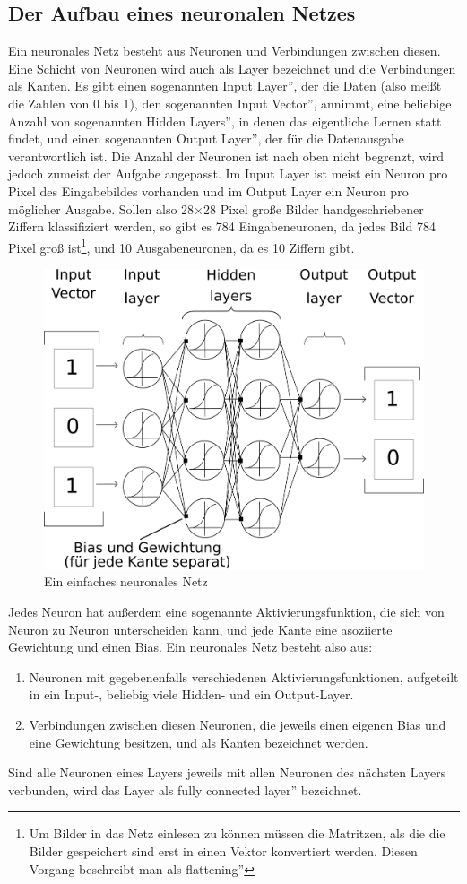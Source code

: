 \documentclass[11pt]{article}
\begin{document}
\subsection{Der Aufbau eines neuronalen Netzes}
Ein neuronales Netz besteht aus Neuronen und Verbindungen zwischen diesen. Eine Schicht von Neuronen wird auch als Layer bezeichnet und die Verbindungen als Kanten. Es gibt einen sogenannten \glqq Input Layer'', der die Daten (also meißt die Zahlen von 0 bis 1), den sogenannten \glqq Input Vector'', annimmt, eine beliebige Anzahl von sogenannten \glqq Hidden Layers'', in denen das eigentliche Lernen statt findet, und einen sogenannten \glqq Output Layer'', der für die Datenausgabe verantwortlich ist. Die Anzahl der Neuronen ist nach oben nicht begrenzt, wird jedoch zumeist der Aufgabe angepasst. Im Input Layer ist meist ein Neuron pro Pixel des Eingabebildes vorhanden und im Output Layer ein Neuron pro möglicher Ausgabe. Sollen also 28$\times$28 Pixel große Bilder handgeschriebener Ziffern klassifiziert werden, so gibt es 784 Eingabeneuronen, da jedes Bild 784 Pixel groß ist\footnote{Um Bilder in das Netz einlesen zu können müssen die Matritzen, als die die Bilder gespeichert sind erst in einen Vektor konvertiert werden. Diesen Vorgang beschreibt man als \glqq flattening''}, und 10 Ausgabeneuronen, da es 10 Ziffern gibt.
\begin{figure}[h]
\centering
\includegraphics[width=\linewidth]{../graphics/Neural_Net.png}
\caption{Ein einfaches neuronales Netz}
\end{figure}
Jedes Neuron hat außerdem eine sogenannte Aktivierungsfunktion, die sich von Neuron zu Neuron unterscheiden kann, und jede Kante eine asoziierte Gewichtung und einen Bias. Ein neuronales Netz besteht also aus:
\begin{enumerate}
	\item Neuronen mit gegebenenfalls verschiedenen Aktivierungsfunktionen, aufgeteilt in ein Input-, beliebig viele Hidden- und ein Output-Layer.
	\item Verbindungen zwischen diesen Neuronen, die jeweils einen eigenen Bias und eine Gewichtung besitzen, und als Kanten bezeichnet werden.
\end{enumerate}
Sind alle Neuronen eines Layers jeweils mit allen Neuronen des nächsten Layers verbunden, wird das Layer als \glqq fully connected layer'' bezeichnet.
\end{document}
